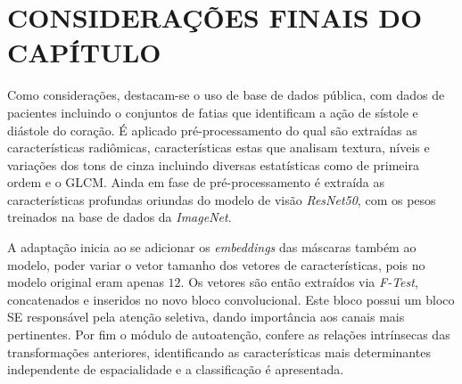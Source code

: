 \section{CONSIDERAÇÕES FINAIS DO CAPÍTULO}
\label{sec:cap4_consideracoes_finais}

Como considerações, destacam-se o uso de base de dados pública, com dados de pacientes incluindo o conjuntos de fatias que identificam a ação de sístole e diástole do coração. É aplicado pré-processamento do qual são extraídas as características radiômicas, características estas que analisam textura, níveis e variações dos tons de cinza incluindo diversas estatísticas como de primeira ordem e o \gls{GLCM}. Ainda em fase de pré-processamento é extraída as características profundas oriundas do modelo de visão \textit{ResNet50}, com os pesos treinados na base de dados da \textit{ImageNet}. 

A adaptação inicia ao se adicionar os \textit{embeddings} das máscaras também ao modelo, poder variar o vetor tamanho dos vetores de características, pois no modelo original eram apenas $12$. Os vetores são então extraídos via \textit{F-Test}, concatenados e inseridos no novo bloco convolucional. Este bloco possui um bloco \gls{SE} responsável pela atenção seletiva, dando importância aos canais mais pertinentes. Por fim o módulo de autoatenção, confere as relações intrínsecas das transformações anteriores, identificando as características mais determinantes independente de espacialidade e a classificação é apresentada.
